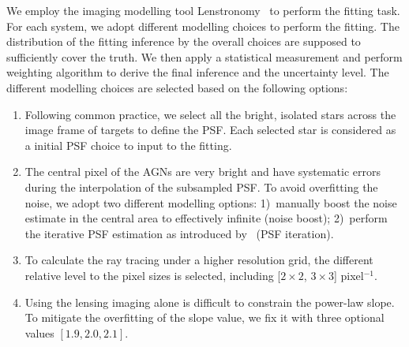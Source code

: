 \documentclass[fleqn,usenatbib]{mnras}
\newcommand{\lenstronomy}{{\sc Lenstronomy}}
\begin{document}
We employ the imaging modelling tool \lenstronomy~\citep{lenstronomy} to perform the fitting task. For each system, we adopt different modelling choices to perform the fitting. The distribution of the fitting inference by the overall choices are supposed to sufficiently cover the truth. We then apply a statistical measurement and perform weighting algorithm to derive the final inference and the uncertainty level. The different modelling choices are selected based on the following options:
\begin{enumerate}
\item Following common practice, we select all the bright, isolated stars across the image frame of targets to define the PSF. Each selected star is considered as a initial PSF choice to input to the fitting.
\item The central pixel of the AGNs are very bright and have systematic errors during the interpolation of the subsampled PSF. To avoid overfitting the noise, we adopt two different modelling options: 1)~manually boost the noise estimate in the central area to effectively infinite (noise boost); 2)~perform the iterative PSF estimation as introduced by~\citet{Chen2016, Birrer2019} (PSF iteration).
\item To calculate the ray tracing under a higher resolution grid, the different relative level to the pixel sizes is selected, including [$2\times2$, $3\times3$] pixel$^{-1}$.
\item Using the lensing imaging alone is difficult to constrain the power-law slope. To mitigate the overfitting of the slope value, we fix it with three optional values $[1.9, 2.0, 2.1]$.
\end{enumerate}
\end{document}
